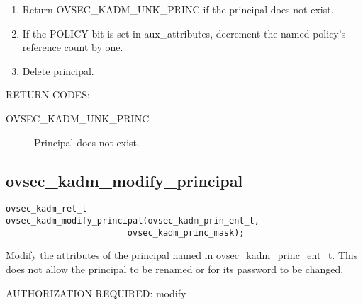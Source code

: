 \begin{enumerate}
\item Return OVSEC_KADM_UNK_PRINC if the principal does not exist.
\item If the POLICY bit is set in aux_attributes, decrement the named
policy's reference count by one.
\item Delete principal.
\end{enumerate}

RETURN CODES: 

\begin{description}
\item[OVSEC_KADM_UNK_PRINC] Principal does not exist.
\end{description}

\subsection{ovsec_kadm_modify_principal}

\begin{verbatim}
ovsec_kadm_ret_t
ovsec_kadm_modify_principal(ovsec_kadm_prin_ent_t,
                        ovsec_kadm_princ_mask);
\end{verbatim}

Modify the attributes of the principal named in
ovsec_kadm_princ_ent_t. This does not allow the principal to be
renamed or for its password to be changed.

AUTHORIZATION REQUIRED: modify

